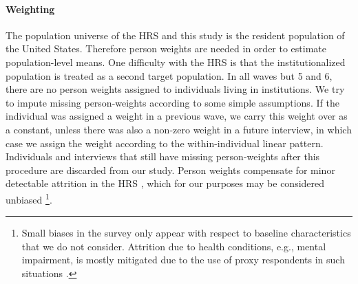 \documentclass[11pt,oneside]{article} %
\begin{document}
\paragraph*{Weighting}
The population universe of the HRS and this study is the resident
population of the United States. Therefore person weights are needed in
order to estimate population-level means. 
One difficulty with the HRS is that the institutionalized population is treated
as a second target population. In all waves but 5 and 6, there are no person weights
assigned to individuals living in institutions. We try to impute missing
person-weights according to some simple assumptions. If the individual was
assigned a weight in a previous wave, we carry this weight over as a constant, unless there was also a non-zero weight in a future interview, in
which case we assign the weight according to the within-individual linear
pattern. Individuals and interviews that still have missing person-weights
after this procedure are discarded from our study. Person weights compensate for
minor detectable attrition in the HRS \citep{kapteyn2006effects}, which for
our purposes may be considered unbiased \footnote{Small biases in the survey
only appear with respect to baseline characteristics that we do not consider.
Attrition due to health conditions, e.g., mental impairment, is mostly mitigated
due to the use of proxy respondents in such situations \citep{weir2011proxy}.}.
\end{document}
